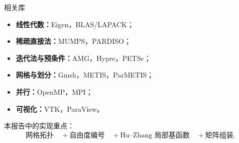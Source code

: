 \documentclass[aspectratio=169,professionalfonts]{ctexbeamer}
\begin{document}
\begin{frame}{相关库}

\begin{itemize}
  \item \textbf{线性代数：}Eigen，BLAS/LAPACK；
  \item \textbf{稀疏直接法：}MUMPS，PARDISO；
  \item \textbf{迭代法与预条件：}AMG，Hypre，PETSc；
  \item \textbf{网格与划分：}Gmsh，METIS，ParMETIS；
  \item \textbf{并行：}OpenMP，MPI；
  \item \textbf{可视化：}VTK，ParaView。
\end{itemize}

\vspace{0.6em}

本报告中的实现重点：
$$
\text{网格拓扑}
\quad+
\text{自由度编号}
\quad+
\text{Hu--Zhang 局部基函数}
\quad+
\text{矩阵组装}.
$$

\end{frame}
\end{document}
